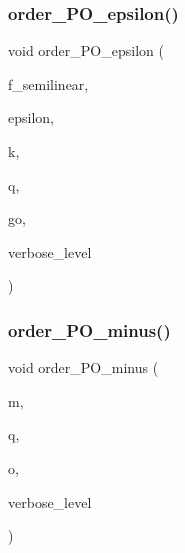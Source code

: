 \mbox{\label{_l_i_b_2_g_a_l_o_i_s_2orthogonal__points_8_c_accb4a5b687f3a8d953d08f20dbd2259d}} 
\subsubsection{\texorpdfstring{order\+\_\+\+P\+O\+\_\+epsilon()}{order\_PO\_epsilon()}}
{\footnotesize\ttfamily void order\+\_\+\+P\+O\+\_\+epsilon (\begin{DoxyParamCaption}\item[{\mbox{\hyperlink{galois_8h_a09fddde158a3a20bd2dcadb609de11dc}{I\+NT}}}]{f\+\_\+semilinear,  }\item[{\mbox{\hyperlink{galois_8h_a09fddde158a3a20bd2dcadb609de11dc}{I\+NT}}}]{epsilon,  }\item[{\mbox{\hyperlink{galois_8h_a09fddde158a3a20bd2dcadb609de11dc}{I\+NT}}}]{k,  }\item[{\mbox{\hyperlink{galois_8h_a09fddde158a3a20bd2dcadb609de11dc}{I\+NT}}}]{q,  }\item[{\mbox{\hyperlink{classlonginteger__object}{longinteger\+\_\+object}} \&}]{go,  }\item[{\mbox{\hyperlink{galois_8h_a09fddde158a3a20bd2dcadb609de11dc}{I\+NT}}}]{verbose\+\_\+level }\end{DoxyParamCaption})}

\mbox{\label{_l_i_b_2_g_a_l_o_i_s_2orthogonal__points_8_c_a291cf918a191effbb110a631cbc63949}} 
\subsubsection{\texorpdfstring{order\+\_\+\+P\+O\+\_\+minus()}{order\_PO\_minus()}}
{\footnotesize\ttfamily void order\+\_\+\+P\+O\+\_\+minus (\begin{DoxyParamCaption}\item[{\mbox{\hyperlink{galois_8h_a09fddde158a3a20bd2dcadb609de11dc}{I\+NT}}}]{m,  }\item[{\mbox{\hyperlink{galois_8h_a09fddde158a3a20bd2dcadb609de11dc}{I\+NT}}}]{q,  }\item[{\mbox{\hyperlink{classlonginteger__object}{longinteger\+\_\+object}} \&}]{o,  }\item[{\mbox{\hyperlink{galois_8h_a09fddde158a3a20bd2dcadb609de11dc}{I\+NT}}}]{verbose\+\_\+level }\end{DoxyParamCaption})}


